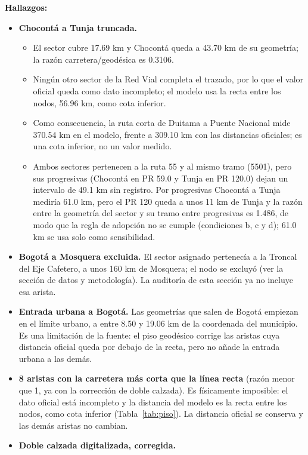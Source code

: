 \documentclass[12pt,a4paper]{article}
\begin{document}
\textbf{Hallazgos:}

\begin{itemize}
\item \textbf{Chocontá a Tunja truncada.}
\begin{itemize}
\item El sector cubre 17.69 km y Chocontá queda a 43.70 km de su geometría; la
razón carretera/geodésica es 0.3106.
\item Ningún otro sector de la Red Vial completa el trazado, por lo que el valor
oficial queda como dato incompleto; el modelo usa la recta entre los nodos,
56.96 km, como cota inferior.
\item Como consecuencia, la ruta corta de Duitama a Puente Nacional mide 370.54 km
en el modelo, frente a 309.10 km con las distancias oficiales; es una cota
inferior, no un valor medido.
\item Ambos sectores pertenecen a la ruta 55 y al mismo tramo (5501), pero sus
progresivas (Chocontá en PR 59.0 y Tunja en PR 120.0) dejan un intervalo de
49.1 km sin registro. Por progresivas Chocontá a Tunja mediría 61.0 km, pero
el PR 120 queda a unos 11 km de Tunja y la razón entre la geometría del sector
y su tramo entre progresivas es 1.486, de modo que la regla de adopción no se
cumple (condiciones b, c y d); 61.0 km se usa solo como sensibilidad.
\end{itemize}
\item \textbf{Bogotá a Mosquera excluida.} El sector asignado pertenecía a
la Troncal del Eje Cafetero, a unos 160 km de Mosquera; el nodo se excluyó
(ver la sección de datos y metodología). La auditoría de esta sección ya no
incluye esa arista.
\item \textbf{Entrada urbana a Bogotá.} Las geometrías que salen de Bogotá
empiezan en el límite urbano, a entre 8.50 y 19.06 km de la coordenada del
municipio. Es una limitación de la fuente: el piso geodésico corrige las
aristas cuya distancia oficial queda por debajo de la recta, pero no añade la
entrada urbana a las demás.
\item \textbf{8 aristas con la carretera más corta que la línea recta} (razón
menor que 1, ya con la corrección de doble calzada). Es físicamente imposible:
el dato oficial está incompleto y la distancia del modelo es la recta entre los
nodos, como cota inferior (Tabla~\ref{tab:piso}). La distancia oficial se
conserva y las demás aristas no cambian.
\item \textbf{Doble calzada digitalizada, corregida.}
\begin{itemize}

\end{itemize}
\end{itemize}
\end{document}
